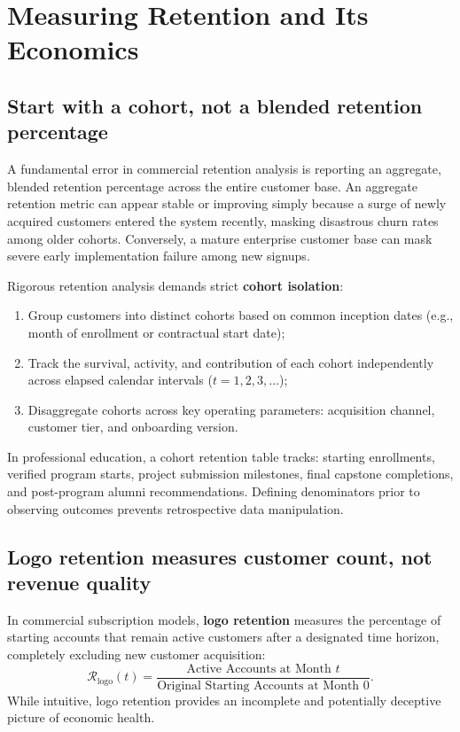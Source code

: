 \section{Measuring Retention and Its Economics}

\subsection{Start with a cohort, not a blended retention percentage}

A fundamental error in commercial retention analysis is reporting an aggregate, blended retention percentage across the entire customer base. An aggregate retention metric can appear stable or improving simply because a surge of newly acquired customers entered the system recently, masking disastrous churn rates among older cohorts. Conversely, a mature enterprise customer base can mask severe early implementation failure among new signups.

Rigorous retention analysis demands strict \textbf{cohort isolation}:
\begin{enumerate}
\item Group customers into distinct cohorts based on common inception dates (e.g., month of enrollment or contractual start date);
\item Track the survival, activity, and contribution of each cohort independently across elapsed calendar intervals ($t = 1, 2, 3, \dots$);
\item Disaggregate cohorts across key operating parameters: acquisition channel, customer tier, and onboarding version.
\end{enumerate}
In professional education, a cohort retention table tracks: starting enrollments, verified program starts, project submission milestones, final capstone completions, and post-program alumni recommendations. Defining denominators prior to observing outcomes prevents retrospective data manipulation.

\subsection{Logo retention measures customer count, not revenue quality}

In commercial subscription models, \textbf{logo retention} measures the percentage of starting accounts that remain active customers after a designated time horizon, completely excluding new customer acquisition:
\begin{equation}
\mathcal{R}_{\text{logo}}(t) = \frac{\text{Active Accounts at Month } t}{\text{Original Starting Accounts at Month } 0}.
\end{equation}
While intuitive, logo retention provides an incomplete and potentially deceptive picture of economic health.

